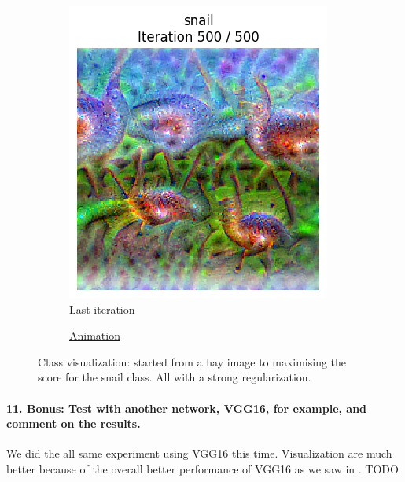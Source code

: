 \begin{figure}[H]
    \centering
    \begin{subfigure}{.5\textwidth}
        \centering
        \includegraphics[width=.7\linewidth]{SqueezeNet/SqueezeNet_snail_animated_init_img_reg++_last_frame.png}
        \caption{Last iteration}
        \label{fig:class_viz_start_image_dif:png}
    \end{subfigure}%
    \begin{subfigure}{.5\textwidth}
        \centering
        \caption{\href{figs/2b/SqueezeNet/SqueezeNet_snail_animated_init_img_reg++.gif}{Animation}}
        \label{fig:class_viz_start_image_dif:vid}
    \end{subfigure}

    \caption{Class visualization: started from a hay image to maximising the score for the snail class. All with a strong regularization.}
    \label{fig:class_viz_start_image_dif}
\end{figure}

\paragraph*{11. \textbf{Bonus:} Test with another network, VGG16, for example, and comment on the results.}
We did the all same experiment using VGG16 this time. Visualization are much better because of the overall better performance of VGG16 as we saw in . %
TODO

